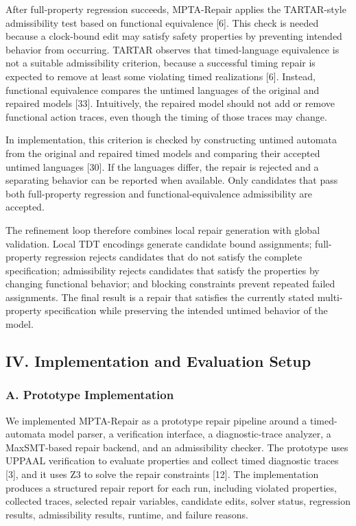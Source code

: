 \documentclass[
]{article}
\begin{document}
After full-property regression succeeds, MPTA-Repair applies the
TARTAR-style admissibility test based on functional equivalence {[}6{]}.
This check is needed because a clock-bound edit may satisfy safety
properties by preventing intended behavior from occurring. TARTAR
observes that timed-language equivalence is not a suitable admissibility
criterion, because a successful timing repair is expected to remove at
least some violating timed realizations {[}6{]}. Instead, functional
equivalence compares the untimed languages of the original and repaired
models {[}33{]}. Intuitively, the repaired model should not add or
remove functional action traces, even though the timing of those traces
may change.

In implementation, this criterion is checked by constructing untimed
automata from the original and repaired timed models and comparing their
accepted untimed languages {[}30{]}. If the languages differ, the repair
is rejected and a separating behavior can be reported when available.
Only candidates that pass both full-property regression and
functional-equivalence admissibility are accepted.

The refinement loop therefore combines local repair generation with
global validation. Local TDT encodings generate candidate bound
assignments; full-property regression rejects candidates that do not
satisfy the complete specification; admissibility rejects candidates
that satisfy the properties by changing functional behavior; and
blocking constraints prevent repeated failed assignments. The final
result is a repair that satisfies the currently stated multi-property
specification while preserving the intended untimed behavior of the
model.

\subsection{IV. Implementation and Evaluation
Setup}\label{iv.-implementation-and-evaluation-setup}

\subsubsection{A. Prototype
Implementation}\label{a.-prototype-implementation}

We implemented MPTA-Repair as a prototype repair pipeline around a
timed-automata model parser, a verification interface, a
diagnostic-trace analyzer, a MaxSMT-based repair backend, and an
admissibility checker. The prototype uses UPPAAL verification to
evaluate properties and collect timed diagnostic traces {[}3{]}, and it
uses Z3 to solve the repair constraints {[}12{]}. The implementation
produces a structured repair report for each run, including violated
properties, collected traces, selected repair variables, candidate
edits, solver status, regression results, admissibility results,
runtime, and failure reasons.
\end{document}
